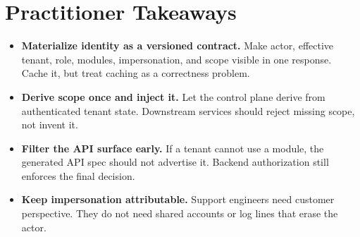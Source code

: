 \section*{Practitioner Takeaways}

\begin{itemize}
  \item \textbf{Materialize identity as a versioned contract.} Make actor, effective tenant, role, modules, impersonation, and scope visible in one response. Cache it, but treat caching as a correctness problem.
  \item \textbf{Derive scope once and inject it.} Let the control plane derive \scopeprefix{} from authenticated tenant state. Downstream services should reject missing scope, not invent it.
  \item \textbf{Filter the API surface early.} If a tenant cannot use a module, the generated API spec should not advertise it. Backend authorization still enforces the final decision.
  \item \textbf{Keep impersonation attributable.} Support engineers need customer perspective. They do not need shared accounts or log lines that erase the actor.
\end{itemize}
